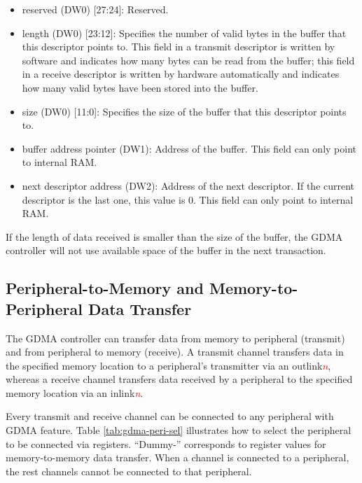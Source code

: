 \documentclass[main\_\_EN.tex]{subfiles}
\begin{document}
\begin{itemize}
    1: The received data has errors.\\
    This bit is used only when UHCI or PARLIO uses GDMA to receive data. When an error is detected in the received data segment corresponding to a descriptor, this bit in the receive descriptor is set to 1 by hardware.
    \item reserved (DW0) [27:24]: Reserved.
    \item length (DW0) [23:12]: Specifies the number of valid bytes in the buffer that this descriptor points to. This field in a transmit descriptor is written by software and indicates how many bytes can be read from the buffer; this field in a receive descriptor is written by hardware automatically and indicates how many valid bytes have been stored into the buffer.
    \item size (DW0) [11:0]: Specifies the size of the buffer that this descriptor points to.
    \item buffer address pointer (DW1): Address of the buffer. This field can only point to internal RAM.
    \item next descriptor address (DW2): Address of the next descriptor. If the current descriptor is the last one, this value is 0. This field can only point to internal RAM.
\end{itemize}

If the length of data received is smaller than the size of the buffer, the GDMA controller will not use available space of the buffer in the next transaction.

\subsection{Peripheral-to-Memory and Memory-to-Peripheral Data Transfer}

The GDMA controller can transfer data from memory to peripheral (transmit) and from peripheral to memory (receive). A transmit channel transfers data in the specified memory location to a peripheral's transmitter via an outlink\textcolor{red}{\it{n}}, whereas a receive channel transfers data received by a peripheral to the specified memory location via an inlink\textcolor{red}{\it{n}}.

Every transmit and receive channel can be connected to any peripheral with GDMA feature. Table \ref{tab:gdma-peri-sel} illustrates how to select the peripheral to be connected via registers. “Dummy-” corresponds to register values for memory-to-memory data transfer. When a channel is connected to a peripheral, the rest channels cannot be connected to that peripheral.
\end{document}
